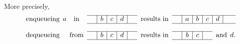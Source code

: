 More precisely,
\[
\begin{array}{c@{\;\,}c@{\,\;}cc|c|c|c|ccc|c|c|c|c|cc@{}}
\cline{4-8}
\cline{10-15}
\text{enqueueing} & a & \text{in} & \phantom{c} & b & c & d &
\phantom{c} 
& \text{results in} & \phantom{c} & a & b & c & d & \phantom{c}\\
\cline{4-8}
\cline{10-15}\\
\cline{4-8}
\cline{10-13}
\text{dequeueing} &   & \text{from} & & b & c & d & 
& \text{results in} & & b & c & \multicolumn{1}{c}{} &
\multicolumn{2}{c@{}}{\text{and} \,\; d.}\\
\cline{4-8}
\cline{10-13}
\end{array}
\]
